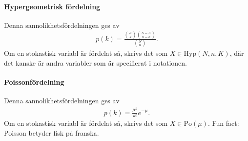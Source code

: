 \paragraph{Hypergeometrisk fördelning}
Denna sannolikhetsfördelningen ges av
\begin{align*}
	p(k) = \frac{\binom{K}{k}\binom{N - K}{n - k}}{\binom{N}{n}}.
\end{align*}
Om en stokastisk variabl är fördelat så, skrivs det som $X\in\text{Hyp}(N, n, K)$, där det kanske är andra variabler som är specifierat i notationen.

\paragraph{Poissonfördelning}
Denna sannolikhetsfördelningen ges av
\begin{align*}
	p(k) = \frac{\mu^k}{k!}e^{-\mu}.
\end{align*}
Om en stokastisk variabl är fördelat så, skrivs det som $X\in\text{Po}(\mu)$. Fun fact: Poisson betyder fisk på franska.